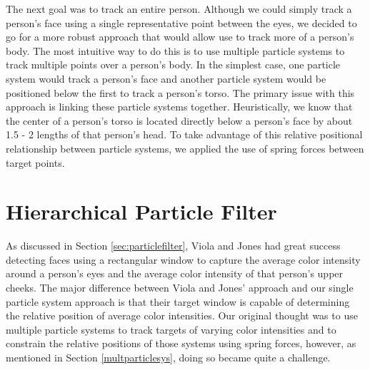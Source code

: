 \documentclass[11pt]{article}
\begin{document}
The next goal was to track an entire person. Although we could simply track a person's face using a single representative point between the eyes, we decided to go for a more robust approach that would allow use to track more of a person's body. The most intuitive way to do this is to use multiple particle systems to track multiple points over a person's body. In the simplest case, one particle system would track a person's face and another particle system would be positioned below the first to track a person's torso. The primary issue with this approach is linking these particle systems together. Heuristically, we know that the center of a person's torso is located directly below a person's face by about 1.5 - 2 lengths of that person's head. To take advantage of this relative positional relationship between particle systems, we applied the use of spring forces between target points.




\section{Hierarchical Particle Filter}
\label{sec:hybridfilter}

As discussed in Section \ref{sec:particlefilter}, Viola and Jones had great success detecting faces using a rectangular window to capture the average color intensity around a person's eyes and the average color intensity of that person's upper cheeks. The major difference between Viola and Jones' approach and our single particle system approach is that their target window is capable of determining the relative position of average color intensities. Our original thought was to use multiple particle systems to track targets of varying color intensities and to constrain the relative positions of those systems using spring forces, however, as mentioned in Section \ref{multparticlesys}, doing so became quite a challenge. 
\end{document}
